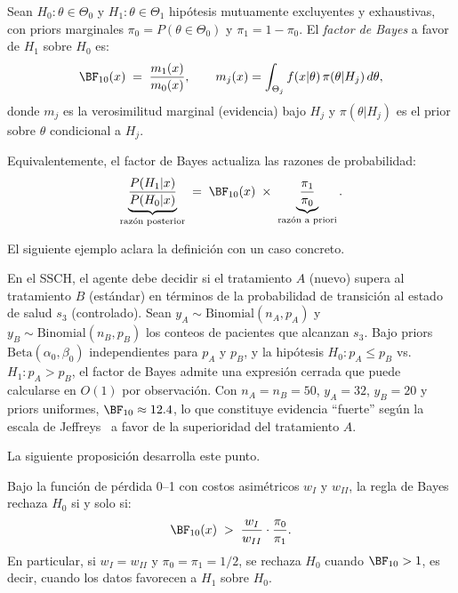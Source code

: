 \begin{definition}
  \label{def:ch4-bayes-factor}
  Sean $H_0: \theta \in \Theta_0$ y $H_1: \theta \in \Theta_1$ hipótesis
  mutuamente excluyentes y exhaustivas, con priors marginales $\pi_0 = P(\theta
  \in \Theta_0)$ y $\pi_1 = 1 - \pi_0$. El \emph{factor de Bayes} a favor de $H_1$
  sobre $H_0$ es:
  \[
    \BF_{10}(x) \;=\; \frac{m_1(x)}{m_0(x)},
    \qquad
    m_j(x) = \int_{\Theta_j} f(x|\theta)\,\pi(\theta|H_j)\,d\theta,
  \]
  donde $m_j$ es la verosimilitud marginal (evidencia) bajo $H_j$ y
  $\pi(\theta|H_j)$ es el prior sobre $\theta$ condicional a $H_j$.

  Equivalentemente, el factor de Bayes actualiza las razones de probabilidad:
  \[
    \underbrace{\frac{P(H_1|x)}{P(H_0|x)}}_{\text{razón posterior}}
    \;=\; \BF_{10}(x) \;\times\;
    \underbrace{\frac{\pi_1}{\pi_0}}_{\text{razón a priori}}.
  \]
\end{definition}

El siguiente ejemplo aclara la definición con un caso concreto.

\begin{example}
\label{ex:ch4-bf-ssch}
En el SSCH, el agente debe decidir si el tratamiento $A$ (nuevo) supera al
tratamiento $B$ (estándar) en términos de la probabilidad de transición al estado
de salud $s_3$ (controlado). Sean $y_A \sim \text{Binomial}(n_A, p_A)$ y
$y_B \sim \text{Binomial}(n_B, p_B)$ los conteos de pacientes que alcanzan $s_3$.
Bajo priors $\text{Beta}(\alpha_0, \beta_0)$ independientes para $p_A$ y $p_B$, y
la hipótesis $H_0: p_A \leq p_B$ vs.\ $H_1: p_A > p_B$, el factor de Bayes admite
una expresión cerrada que puede calcularse en $O(1)$ por observación. Con
$n_A = n_B = 50$, $y_A = 32$, $y_B = 20$ y priors uniformes, $\BF_{10} \approx
12.4$, lo que constituye evidencia ``fuerte'' según la escala de
Jeffreys~\cite{kass1995bayes} a favor de la superioridad del tratamiento $A$.
\end{example}

La siguiente proposición desarrolla este punto.

\begin{proposition}
\label{thm:ch4-bayes-decision}
Bajo la función de pérdida 0--1 con costos asimétricos $w_I$ y $w_{II}$, la
regla de Bayes rechaza $H_0$ si y solo si:
\[
  \BF_{10}(x) \;>\; \frac{w_I}{w_{II}} \cdot \frac{\pi_0}{\pi_1}.
\]
En particular, si $w_I = w_{II}$ y $\pi_0 = \pi_1 = 1/2$, se rechaza $H_0$ cuando
$\BF_{10} > 1$, es decir, cuando los datos favorecen a $H_1$ sobre $H_0$.
\end{proposition}


